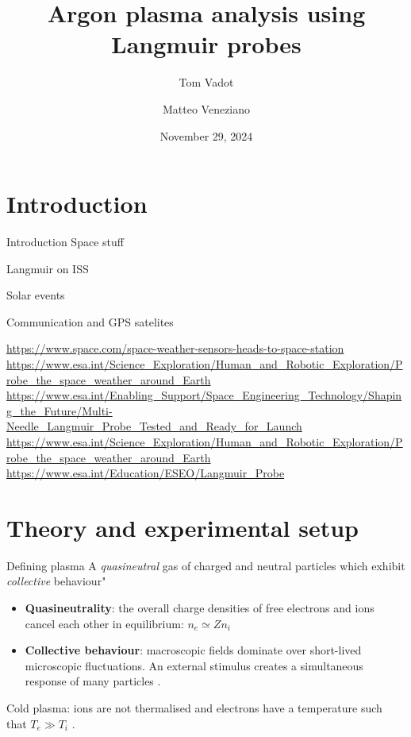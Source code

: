 \documentclass[10pt]{beamer}
\title{Argon plasma analysis using Langmuir probes}
\author{Tom Vadot \and Matteo Veneziano}
\institute{EPFL Section of Physics}
\date{November 29, 2024}
\begin{document}
\begin{frame}
    \titlepage
\end{frame}

\section{Introduction}
\begin{frame}{Introduction}
    Space stuff

    Langmuir on ISS

    Solar events

    Communication and GPS satelites

    \url{https://www.space.com/space-weather-sensors-heads-to-space-station}
    \url{https://www.esa.int/Science_Exploration/Human_and_Robotic_Exploration/Probe_the_space_weather_around_Earth}
    \url{https://www.esa.int/Enabling_Support/Space_Engineering_Technology/Shaping_the_Future/Multi-Needle_Langmuir_Probe_Tested_and_Ready_for_Launch}
    \url{https://www.esa.int/Science_Exploration/Human_and_Robotic_Exploration/Probe_the_space_weather_around_Earth}
    \url{https://www.esa.int/Education/ESEO/Langmuir_Probe}
\end{frame}

\section{Theory and experimental setup}
\begin{frame}{Defining plasma}
    A \emph{quasineutral} gas of charged and neutral particles which exhibit \emph{collective} behaviour" 
    \vspace{0.5cm}
    \begin{itemize}
        \item \textbf{Quasineutrality}: the overall charge densities of free electrons and ions cancel each other in equilibrium: 
            $n_e \simeq Z n_i$ 

        \item \textbf{Collective behaviour}: macroscopic fields dominate over short-lived microscopic fluctuations.
            An external stimulus creates a simultaneous response of many particles .
    \end{itemize}
    \vspace{0.5cm}
    Cold plasma: ions are not thermalised and electrons have a temperature such that $T_e \gg T_i$ .
\end{frame}
\end{document}
